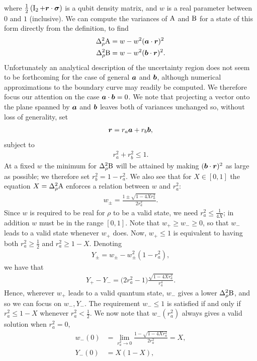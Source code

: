 where $\frac{1}{2}\left(\operatorname{I}_2 + \bm{r}\cdot{\boldsymbol\sigma}\right)$ is a qubit density matrix, and $w$ is a real parameter between $0$ and $1$ (inclusive). We can compute the variances of $\operatorname{A}$ and $\operatorname{B}$ for a state of this form directly from the definition, to find
\begin{align}
  \varr{\opa} &= w - w^2 (\boa\cdot\bor)^2\\
  \varr{\opb} &= w - w^2 (\bob\cdot\bor)^2.
\end{align}
Unfortunately an analytical description of the uncertainty region does not seem to be forthcoming for the case of general $\bm{a}$ and $\bm{b}$, although numerical approximations to the boundary curve may readily be computed. We therefore focus our attention on the case $\bm{a}\cdot\bm{b} = 0$. We note that projecting a vector onto the plane spanned by $\bm{a}$ and $\bm{b}$ leaves both of variances unchanged so, without loss of generality, set 
\begin{align}
  \bm{r} = r_a \bm{a} + r_b \bm{b},
\end{align}
subject to
\begin{align}
  r_a^2 + r_b^2 \leq 1.
\end{align}
At a fixed $w$ the minimum for $\varr{\opb}$ will be attained by making $(\bm{b}\cdot\bm{r})^2$ as large as possible; we therefore set $r_b^2 = 1-r_a^2$. We also see that for $X\in [0,1]$ the equation $X = \varr{\opa}$ enforces a relation between $w$ and $r_a^2$: 
\begin{align}
  w_\pm = \frac{1\pm\sqrt{1 -4 X r_a^2}}{2r_a^2}.
\end{align}
Since $w$ is required to be real for $\rho$ to be a valid state, we need $r_a^2 \leq \frac{1}{4X}$; in addition $w$ must be in the range $[0,1]$. Note that  $w_+\ge w_-\ge 0$, so that $w_-$ leads to a valid state whenever $w_+$ does. Now, $w_+\le 1$ is equivalent to having both $r_a^2\ge\frac12$ and $r_a^2\ge 1-X$. Denoting
\begin{align}
  Y_\pm = w_\pm - w_\pm^2 (1-r_a^2),
\end{align}
we have that
\begin{align}
  Y_+ - Y_- =\bigl(2r_a^2-1\bigr)\frac{\sqrt{1-4 X r_a^2}}{r_a^4}.
\end{align}
Hence, wherever $w_+$ leads to a valid quantum state, $w_-$ gives a lower $\varr{\opb}$, and so we can focus on $w_-, Y_-$.
The requirement  $w_-\le 1$ is satisfied if and only if $r_a^2 \leq 1-X$ whenever $r_a^2 < \frac{1}{2}$. 
We now note that $w_-(r_a^2)$  always gives a valid solution when $r_a^2 = 0$,
\begin{align}
  w_-(0) &= \lim_{r_a^2 \to 0}  \frac{1 - \sqrt{1 -4 X r_a^2}}{2r_a^2} = X,\\
  Y_-(0) &= X(1-X),
\end{align}
